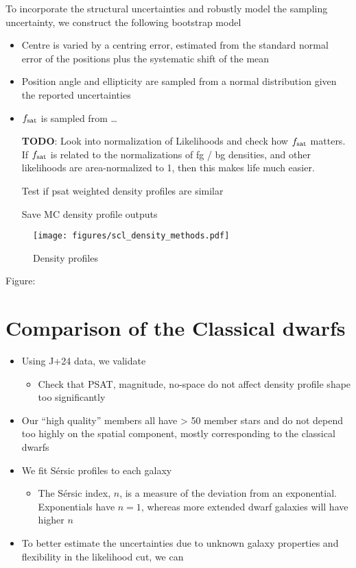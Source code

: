 To incorporate the structural uncertainties and robustly model the
sampling uncertainty, we construct the following bootstrap model

\begin{itemize}
\item
  Centre is varied by a centring error, estimated from the standard
  normal error of the positions plus the systematic shift of the mean
\item
  Position angle and ellipticity are sampled from a normal distribution
  given the reported uncertainties
\item
  \(f_{\rm sat}\) is sampled from \ldots{}

  \textbf{TODO}: Look into normalization of Likelihoods and check how
  \(f_{\rm sat}\) matters. If \(f_{\rm sat}\) is related to the
  normalizations of fg / bg densities, and other likelihoods are
  area-normalized to 1, then this makes life much easier.

  Test if psat weighted density profiles are similar

  Save MC density profile outputs
\end{itemize}

\begin{figure}
\centering
\texttt{[image: figures/scl\_density\_methods.pdf]}
\caption{Density profiles}\label{fig:sculptor_observed_profiles}
\end{figure}

Figure:

\section{Comparison of the Classical
dwarfs}\label{comparison-of-the-classical-dwarfs}

\begin{itemize}
\tightlist
\item
  Using J+24 data, we validate

  \begin{itemize}
  \tightlist
  \item
    Check that PSAT, magnitude, no-space do not affect density profile
    shape too significantly
  \end{itemize}
\item
  Our ``high quality'' members all have \textgreater{} 50 member stars
  and do not depend too highly on the spatial component, mostly
  corresponding to the classical dwarfs
\item
  We fit Sérsic profiles to each galaxy

  \begin{itemize}
  \tightlist
  \item
    The Sérsic index, \(n\), is a measure of the deviation from an
    exponential. Exponentials have \(n=1\), whereas more extended dwarf
    galaxies will have higher \(n\)
  \end{itemize}
\item
  To better estimate the uncertainties due to unknown galaxy properties
  and flexibility in the likelihood cut, we can
\end{itemize}

